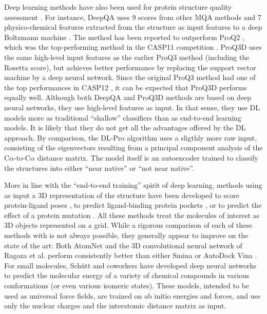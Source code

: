 Deep learning methods have also been used for protein structure
quality assessment \cite{nguyen2014dlpro, cao2016deepqa,
uziela2017proq3d}. For instance, DeepQA \cite{cao2016deepqa} uses 9
scores from other MQA methods and 7 physico-chemical features
extracted from the structure as input features to a deep Boltzmann
machine \cite{}. The method has been reported \cite{cao2016deepqa} to
outperform ProQ2 \cite{ray2012proq2}, which was the top-performing
method in the CASP11 competition \cite{kryshtafovych2015}.
ProQ3D \cite{uziela2017proq3d} uses the same high-level input features
as the earlier ProQ3 method \cite{uziela2016proq3} (including the
Rosetta \cite{leaverfay2011rosetta} score), but achieves better
performance by replacing the support vector machine by a deep neural
network. Since the original ProQ3 method had one of the top
performances in CASP12 \cite{elofsson2017qacasp12}, it can be expected
that ProQ3D performs equally well. Although both DeepQA and ProQ3D
methods are based on deep neural networks, they use high-level
features as input. In that sense, they use DL models more as
traditional ``shallow'' classifiers than as end-to-end learning
models. It is likely that they do not get all the advantages offered
by the DL approach.
%
By comparison, the DL-Pro algorithm \cite{nguyen2014dlpro} uses a
sligthly more raw input, consisting of the eigenvectors resulting from
a principal component analysis of the C$\alpha$-to-C$\alpha$ distance
matrix. The model itself is an autoencoder \cite{} trained to classify
the structures into either ``near native'' or ``not near native''.

More in line with the ``end-to-end training'' spirit of deep learning,
methods using as input a 3D representation of the structure have been
developed to score protein-ligand poses \cite{wallach2015atomnet,
ragoza2017ligandscoring}, to predict ligand-binding protein
pockets \cite{jimenez2017deepsite}, or to predict the effect of a
protein mutation \cite{torng2017}. All these
methods\cite{wallach2015atomnet, ragoza2017ligandscoring,
jimenez2017deepsite, torng2017} treat the molecules of interest as 3D
objects represented on a grid. While a rigorous comparison of each of
these methods with is not always possible, they generally appear to
improve on the state of the art: Both
AtomNet \cite{wallach2015atomnet} and the 3D convolutional neural
network of Ragoza et al. \cite{ragoza2017ligandscoring} perform
consistently better than either Smina \cite{koes2013smina} or AutoDock
Vina \cite{trott2009vina}.
%
For small molecules, Sch\"{u}tt and coworkers \cite{schutt2017nc,
schutt2017moleculenet} have developed deep neural networks to predict
the molecular energy of a variety of chemical compounds in various
conformations (or even various isomeric states). These models,
intended to be used as universal force fields, are trained on ab
initio energies and forces, and use only the nuclear charges and the
interatomic distance matrix as input.
